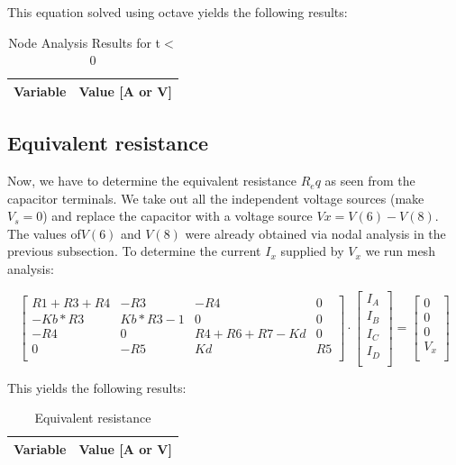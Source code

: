 This equation solved using octave yields the following results:

\begin{table}[H]
    \centering
    \begin{tabular}{|l|r|}
      \hline    
      {\bf Variable} & {\bf Value [A or V]} \\ \hline
      
    \end{tabular}
    \caption{Node Analysis Results for t$<$0}
    \label{tab:nodeanalysis}
  \end{table}
  
  
\subsection{Equivalent resistance}
Now,  we have to determine the equivalent resistance $R_eq$ as seen from the capacitor terminals. We take out all the independent voltage sources (make $V_s=0$) and replace the capacitor with a voltage source $Vx= V(6)-V(8)$. The values of$ V(6)$ and $V(8)$ were already obtained via nodal analysis in the previous subsection. To determine the current $I_x$ supplied by $V_x$ we run mesh analysis:


\begin{equation}\label{eq:matrixeq2}
\begin{bmatrix}
 R1+R3+R4 & -R3 & -R4 & 0\\
    -Kb*R3 &  Kb*R3-1 & 0 & 0\\ 
    -R4 & 0 & R4+R6+R7-Kd & 0\\
    0 & -R5 & Kd & R5 \\
\end{bmatrix}
\cdot
\begin{bmatrix}
I_A\\
I_B \\
I_C \\
I_D \\

    \end{bmatrix}
=
    \begin{bmatrix}
0 \\
0 \\
0 \\
V_x \\

    \end{bmatrix}
  \end{equation}

This yields the following results:

\begin{table}[H]
    \centering
    \begin{tabular}{|l|r|}
      \hline    
      {\bf Variable} & {\bf Value [A or V]} \\ \hline
      
    \end{tabular}
    \caption{Equivalent resistance}
    \label{tab:equivalentresistance}
  \end{table}
  
